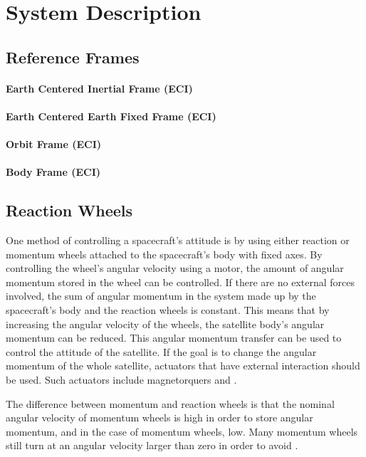 \chapter{System Description}\label{chap:systemDescribtion}

\section{Reference Frames}

\subsubsection{Earth Centered Inertial Frame (ECI)}
\cite{SADC}

\subsubsection{Earth Centered Earth Fixed Frame (ECI)}

\subsubsection{Orbit Frame (ECI)}

\subsubsection{Body Frame (ECI)}


\section{Reaction Wheels}

One method of controlling a spacecraft's attitude is by using either reaction or momentum wheels attached to the spacecraft's body with fixed axes. By controlling the wheel's angular velocity using a motor, the amount of angular momentum stored in the wheel can be controlled. If there are no external forces involved, the sum of angular momentum in the system made up by the spacecraft's body and the reaction wheels is constant. This means that by increasing the angular velocity of the wheels, the satellite body's angular momentum can be reduced. This angular momentum transfer can be used to control the attitude of the satellite. If the goal is to change the angular momentum of the whole satellite, actuators that have external interaction should be used. Such actuators include magnetorquers and  .

The difference between momentum and reaction wheels is that the nominal angular velocity of momentum wheels is high in order to store angular momentum, and in the case of momentum wheels, low. Many momentum wheels still turn at an angular velocity larger than zero in order to avoid .

